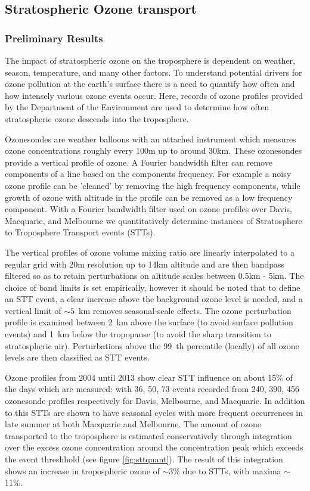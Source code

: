 \subsection{Stratospheric Ozone transport}
\subsubsection{Preliminary Results}
The impact of stratospheric ozone on the troposphere is dependent on weather, season, temperature, and many other factors.
To understand potential drivers for ozone pollution at the earth's surface there is a need to quantify how often and how intensely various ozone events occur.
Here, records of ozone profiles provided by the Department of the Environment are used to determine how often stratospheric ozone descends into the troposphere.

Ozonesondes are weather balloons with an attached instrument which measures ozone concentrations roughly every 100m up to around 30km.
These ozonesondes provide a vertical profile of ozone.
A Fourier bandwidth filter can remove components of a line based on the components frequency.
For example a noisy ozone profile can be 'cleaned' by removing the high frequency components, while growth of ozone with altitude in the profile can be removed as a low frequency component. 
With a Fourier bandwidth filter used on ozone profiles over Davis, Macquarie, and Melbourne we quantitatively determine instances of Stratosphere to Troposphere Transport events (STTs).

The vertical profiles of ozone volume mixing ratio are linearly interpolated to a regular grid with 20m resolution up to 14km altitude and are then bandpass filtered so as to retain perturbations on altitude scales between 0.5km - 5km. 
The choice of band limits is set empirically, however it should be noted that to define an STT event, a clear increase above the background ozone level is needed, and a vertical limit of $\sim 5$~km removes seasonal-scale effects. 
The ozone perturbation profile is examined between 2~km above the surface (to avoid surface pollution events) and 1~km below the tropopause (to avoid the sharp transition to stratospheric air).
Perturbations above the 99~th percentile (locally) of all ozone levels are then classified as STT events.

Ozone profiles from 2004 until 2013 show clear STT influence on about 15\% of the days which are measured: with 36, 50, 73 events recorded from 240, 390, 456 ozonesonde profiles respectively for Davis, Melbourne, and Macquarie.
In addition to this STTs are shown to have seasonal cycles with more frequent occurrences in late summer at both Macquarie and Melbourne.
The amount of ozone transported to the troposphere is estimated conservatively through integration over the excess ozone concentration around the concentration peak which exceeds the event threshhold (see figure \ref{fig:sttquant}).
The result of this integration shows an increase in tropospheric ozone of $\sim$3\% due to STTs, with maxima $\sim$11\%.
 
